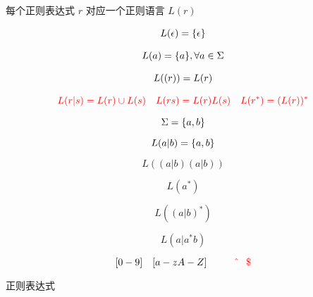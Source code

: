 \begin{frame}{}
  \begin{center}
    每个正则表达式 $r$ 对应一个正则语言 $L(r)$
  \end{center}

  \begin{definition}[正则表达式对应的正则语言]
    \begin{gather}
      L(\epsilon) = \{\epsilon\} \\[8pt]
      L(a) = \{a\}, \forall a \in \Sigma \\[8pt]
      L((r)) = L(r) \\[8pt]
      \textcolor{red}{L(r|s) = L(r) \cup L(s) \quad L(rs) = L(r)L(s)
      \quad L(r^{\ast}) = (L(r))^{\ast}}
    \end{gather}
  \end{definition}
\end{frame}

\begin{frame}{}
  \[
    \Sigma = \{a, b\}
  \]

  \[
    L(a | b) = \{a, b\}
  \]

  \pause
  \[
    L((a | b) (a | b))
  \]

  \pause
  \[
    L(a^{\ast})
  \]

  \pause
  \[
    L((a | b)^{\ast})
  \]

  \pause
  \[
    L(a | a^{\ast}b)
  \]
\end{frame}

\begin{frame}{}
\end{frame}

\begin{frame}{}
  \pause
  \[
    [0-9] \quad [a-zA-Z] \qquad \textcolor{red}{\hat\qquad \$}
  \]
\end{frame}

\begin{frame}{}
  \begin{center}
    正则表达式
  \end{center}

\end{frame}

\begin{frame}{}
\end{frame}

